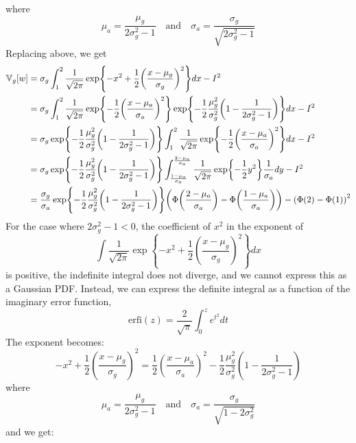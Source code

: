 where
\[
\mu_a = \frac{\mu_g}{2\sigma_g^{2} - 1} 
\quad \text{and} \quad
\sigma_a = \frac{\sigma_g}{\sqrt{2 \sigma_g^{2} - 1}}
\]
Replacing above, we get
\begin{align*}
\VAR_g[w] &= \sigma_g \int_{1}^{2} \frac{1}{\sqrt{2 \pi}} \exp \left\{ -x^{2} +\frac{1}{2} \left(\frac{x - \mu_g}{\sigma_g}\right)^{2} \right\} dx - I^{2} \\
&= \sigma_g \int_{1}^{2} \frac{1}{\sqrt{2 \pi}} \exp \left\{ -\frac{1}{2} \left( \frac{x - \mu_a}{\sigma_a} \right)^{2} \right\} \exp \left\{ - \frac{1}{2} \frac{\mu_g^{2}}{\sigma_g^{2}} \left(1 - \frac{1}{2\sigma_g^{2} - 1} \right) \right\} dx - I^{2} \\
&= \sigma_g \exp \left\{ - \frac{1}{2} \frac{\mu_g^{2}}{\sigma_g^{2}} \left(1 - \frac{1}{2\sigma_g^{2} - 1} \right) \right\} \int_{1}^{2} \frac{1}{\sqrt{2 \pi}} \exp \left\{ -\frac{1}{2} \left( \frac{x - \mu_a}{\sigma_a} \right)^{2} \right\} dx - I^{2} \\
&= \sigma_g \exp \left\{ - \frac{1}{2} \frac{\mu_g^{2}}{\sigma_g^{2}} \left(1 - \frac{1}{2\sigma_g^{2} - 1} \right) \right\} \int_{\frac{1 - \mu_a}{\sigma_a}}^{\frac{2 - \mu_a}{\sigma_a}} \frac{1}{\sqrt{2 \pi}} \exp \left\{ -\frac{1}{2} y^{2} \right\} \frac{1}{\sigma_a} dy - I^{2} \\
&= \frac{\sigma_g}{\sigma_a} \exp \left\{ - \frac{1}{2} \frac{\mu_g^{2}}{\sigma_g^{2}} \left(1 - \frac{1}{2\sigma_g^{2} - 1} \right) \right\}  \left( \Phi\left(\frac{2 - \mu_a}{\sigma_a}\right) - \Phi\left(\frac{1 - \mu_a}{\sigma_a}\right) \right) - \left( \Phi(2) - \Phi(1) \right)^{2}
\end{align*}
For the case where \(2 \sigma_g^{2} - 1 < 0\), the coefficient of \(x^{2}\)
in the exponent of
\[
\int \frac{1}{\sqrt{2 \pi}} \exp \left\{ -x^{2} +\frac{1}{2} \left(\frac{x - \mu_g}{\sigma_g}\right)^{2} \right\} dx
\]
is positive, the indefinite integral does not diverge, and we cannot
express this as a Gaussian PDF. Instead, we can express the definite
integral as a function of the imaginary error function,
\[
\text{erfi}(z) = \frac{2}{\sqrt{\pi}} \int_{0}^z e^{t^{2}} dt
\]
The exponent becomes:
\[
-x^{2} +\frac{1}{2} \left(\frac{x - \mu_g}{\sigma_g}\right)^{2} = \frac{1}{2} \left( \frac{x - \mu_a}{\sigma_a} \right)^{2} - \frac{1}{2} \frac{\mu_g^{2}}{\sigma_g^{2}} \left(1 - \frac{1}{2\sigma_g^{2} - 1} \right)
\]
where
\[
\mu_a = \frac{\mu_g}{2\sigma_g^{2} - 1} 
\quad \text{and} \quad
\sigma_a = \frac{\sigma_g}{\sqrt{1 - 2 \sigma_g^{2}}}
\]
and we get:
